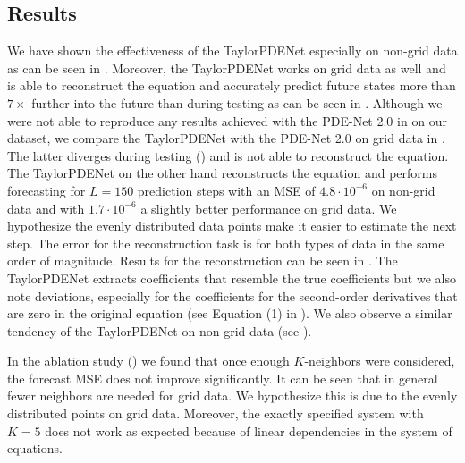 \documentclass[runningheads]{llncs}
\begin{document}
\subsection{Results}
We have shown the effectiveness of the TaylorPDENet especially on non-grid data as can be seen in .
Moreover, the TaylorPDENet works on grid data as well and is able to reconstruct the equation and accurately predict future states more than $7\times$ further into the future than during testing as can be seen in .
Although we were not able to reproduce any results achieved with the PDE-Net 2.0 in \cite{long2019pde} on our dataset, we compare the TaylorPDENet with the PDE-Net 2.0 on grid data in .
The latter diverges during testing () and is not able to reconstruct the equation.
The TaylorPDENet on the other hand reconstructs the equation and performs forecasting for $L=150$ prediction steps with an MSE of $4.8\cdot 10^{-6}$ on non-grid data and with $1.7\cdot 10^{-6}$ a slightly better performance on grid data.
We hypothesize the evenly distributed data points make it easier to estimate the next step.
The error for the reconstruction task is for both types of data in the same order of magnitude.
Results for the reconstruction can be seen in .
The TaylorPDENet extracts coefficients that resemble the true coefficients but we also note deviations, especially for the coefficients for the second-order derivatives that are zero in the original equation (see Equation (1) in ).
We also observe a similar tendency of the TaylorPDENet on non-grid data (see ).

In the ablation study () we found that once enough $K$-neighbors were considered, the forecast MSE does not improve significantly.
It can be seen that in general fewer neighbors are needed for grid data.
We hypothesize this is due to the evenly distributed points on grid data.
Moreover, the exactly specified system with $K=5$ does not work as expected because of linear dependencies in the system of equations.
%
\end{document}
